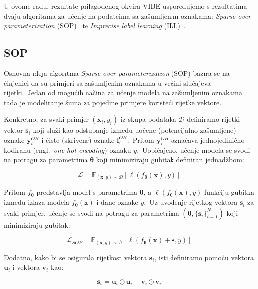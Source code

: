 \documentclass[diplomskirad]{fer}
\begin{document}
U ovome radu, rezultate prilagođenog okvira VIBE uspoređujemo s rezultatima dvaju algoritama za učenje na podatcima sa zašumljenim oznakama: \textit{Sparse over-parameterization} (SOP)~\cite{liu2022robust} te \textit{Imprecise label learning} (ILL)~\cite{chen2024imprecise}.\ 

\subsection{SOP}
\label{sub:sop}

Osnovna ideja algoritma \textit{Sparse over-parameterization} (SOP) bazira se na činjenici da su primjeri sa zašumljenim oznakama u većini slučajeva rijetki.\ 
Jedan od mogućih načina za učenje modela na zašumljenim oznakama tada je modeliranje šuma za pojedine primjere koristeći rijetke vektore.\ 

Konkretno, za svaki primjer $(\bm{x}_i, y_i)$ iz skupa podataka $\mathcal{D}$ definiramo rijetki vektor $\bm{s}_i$ koji služi kao odstupanje između uočene (potencijalno zašumljene) oznake $\bm{y}_i^{OH}$ i čiste (skrivene) oznake $\bm{l}_i^{OH}$.\ 
Pritom $\bm{y}_i^{OH}$ označava jednojedinično kodiranu (engl.\ \textit{one-hot encoding}) oznaku $y$.\ Uobičajeno, učenje modela se svodi na potragu za parametrima $\bm{\theta}$ koji minimiziraju gubitak definiran jednadžbom:

\begin{equation}
  \mathcal{L} = \mathbb{E}_{(\bm{x}, y) \sim \mathcal{D}} \left[ \ell(f_{\bm{\theta}}(\bm{x}), y) \right]
  \label{eq:sop1}
\end{equation}

Pritom $f_{\bm{\theta}}$ predstavlja model s parametrima $\bm{\theta}$, a $\ell(f_{\bm{\theta}}(\bm{x}), y)$ funkciju gubitka između izlaza modela $f_{\bm{\theta}}(\bm{x})$ i dane oznake $y$.\ 
Uz uvođenje rijetkog vektora $\bm{s}_i$ za svaki primjer, učenje se svodi na potragu za parametrima $(\bm{\theta}, \{\bm{s}_i\}_{i=1}^N)$ koji minimiziraju gubitak:

\begin{equation}
  \mathcal{L}_{SOP} = \mathbb{E}_{(\bm{x}, y) \sim \mathcal{D}} \left[ \ell(f_{\bm{\theta}}(\bm{x}) + \bm{s}, y) \right]
  \label{eq:sop2}
\end{equation}

Dodatno, kako bi se osigurala rijetkost vektora $\bm{s}_i$, isti definiramo pomoću vektora $\bm{u}_i$ i vektora $\bm{v}_i$ kao:

\begin{equation}
  \bm{s}_i = \bm{u}_i \odot \bm{u}_i - \bm{v}_i \odot \bm{v}_i
  \label{eq:sop_s1}
\end{equation}
\end{document}
